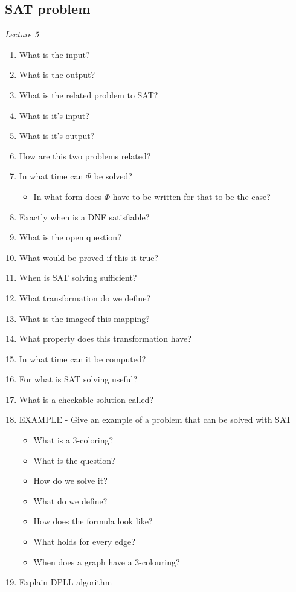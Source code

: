 \documentclass[fleqn]{article}
\begin{document}
\subsection{SAT problem}
\textit{Lecture 5}
\begin{enumerate}
    \item What is the input?
    \item What is the output?
    \item What is the related problem to SAT?
    \item What is it's input?
    \item What is it's output?
    \item How are this two problems related?
    \item In what time can $\Phi$ be solved?
    \begin{itemize}
        \item In what form does $\Phi$ have to be written for that to be the case?
    \end{itemize}
    \item Exactly when is a DNF satisfiable?
    \item What is the open question?
    \item What would be proved if this it true?
    \item When is SAT solving sufficient?
    \item What transformation do we define?
    \item What is the imageof this mapping?
    \item What property does this transformation have?
    \item In what time can it be computed?
    \item For what is SAT solving useful?
    \item What is a checkable solution called?
    \item EXAMPLE - Give an example of a problem that can be solved with SAT
    \begin{itemize}
        \item What is a 3-coloring?
        \item What is the question?
        \item How do we solve it?
        \item What do we define?
        \item How does the formula look like?
        \item What holds for every edge?
        \item When does a graph have a 3-colouring?
    \end{itemize}
    \item Explain DPLL algorithm
\end{enumerate}
\end{document}
